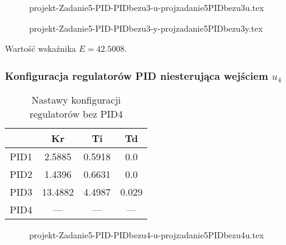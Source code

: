 
\ifdefined\CompileFigures
\begin{figure}[H] 
    \centering
    
    \caption{projekt-Zadanie5-PID-PIDbezu3-u-projzadanie5PIDbezu3u.tex}
    \label{projekt:zad5:figure:projzadanie5PIDbezu3u}
\end{figure}
\fi

\ifdefined\CompileFigures
\begin{figure}[H] 
    \centering
    
    \caption{projekt-Zadanie5-PID-PIDbezu3-y-projzadanie5PIDbezu3y.tex}
    \label{projekt:zad5:figure:projzadanie5PIDbezu3y}
\end{figure}
\fi

Wartość wskaźnika $E=\num{42.5008}$.

\subsubsection{Konfiguracja regulatorów PID niesterująca wejściem $u_{4}$}

\begin{table}[H]
    \centering
    \begin{tabular}{|l|c|c|c|}
    \hline
         & Kr  & Ti  & Td  \\ \hline
    PID1 & 2.5885 & 0.5918 & 0.0 \\ \hline
    PID2 & 1.4396 & 0.6631 & 0.0 \\ \hline
    PID3 & 13.4882 & 4.4987 & 0.029 \\ \hline
    PID4 & --- & --- & --- \\ \hline
    \end{tabular}
    \caption[H]{Nastawy konfiguracji regulatorów bez PID4}
\end{table}


\ifdefined\CompileFigures
\begin{figure}[H] 
    \centering
    
    \caption{projekt-Zadanie5-PID-PIDbezu4-u-projzadanie5PIDbezu4u.tex}
    \label{projekt:zad5:figure:projzadanie5PIDbezu4u}
\end{figure}
\fi

